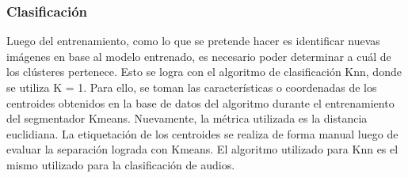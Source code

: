\documentclass[a4paper, 12pt]{article}
\begin{document}
\subsubsection{Clasificación}

Luego del entrenamiento, como lo que se pretende hacer es identificar nuevas imágenes en base al modelo entrenado, es necesario poder determinar a cuál de los clústeres pertenece. Esto se logra con el algoritmo de clasificación Knn, donde se utiliza K = 1. Para ello, se toman las características o coordenadas de los centroides obtenidos en la base de datos del algoritmo durante el entrenamiento del segmentador Kmeans. Nuevamente, la métrica utilizada es la distancia euclidiana. La etiquetación de los centroides se realiza de forma manual luego de evaluar la separación lograda con Kmeans. El algoritmo utilizado para Knn es el mismo utilizado para la clasificación de audios.
\end{document}
